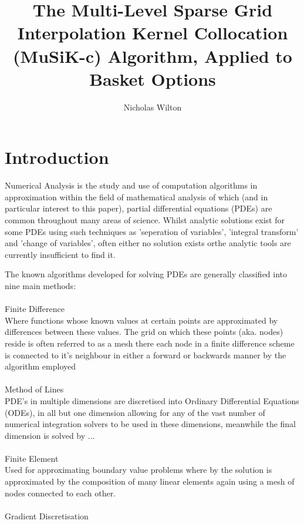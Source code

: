 \documentclass[a4paper]{amsart}
\begin{document}
\title[Multi-Level Sparse Grid Interpolation Kernel Collocation (MuSiKc)]
{The Multi-Level Sparse Grid Interpolation Kernel Collocation (MuSiK-c) Algorithm, Applied to Basket Options}
\author[Nicholas Wilton]{Nicholas Wilton}


\maketitle

\section{Introduction}

Numerical Analysis is the study and use of computation algorithms in approximation within the field of mathematical analysis of which (and in particular interest to this paper), partial differential equations (PDEs) are common throughout many areas of science. Whilst analytic solutions exist for some PDEs using such techniques as 'seperation of variables', 'integral transform' and 'change of variables', often either no solution exists orthe analytic tools are currently insufficient to find it.   

The known algorithms developed for solving PDEs are generally classified into nine main methods:\\
\\
\textperiodcentered Finite Difference\\
Where functions whose known values at certain points are approximated by differences between these values. The grid on which these points (aka. nodes) reside is often referred to as a mesh there each node in a finite difference scheme is connected to it's neighbour in either a forward or backwards manner by the algorithm employed\\
\\ 
\textperiodcentered Method of Lines\\
PDE's in multiple dimensions are discretised into Ordinary Differential Equations (ODEs), in all but one dimension allowing for any of the vast number of numerical integration solvers to be used in these dimensions, meanwhile the final dimension is solved by ...\\
\\ 
\textperiodcentered Finite Element\\
Used for approximating boundary value problems where by the solution is approximated by the composition of many linear elements again using a mesh of nodes connected to each other.\\
\\
\textperiodcentered Gradient Discretisation\\
\end{document}
